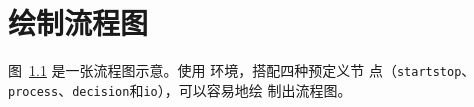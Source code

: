 
\chapter{绘制流程图}

图~\ref{fig:flow_chart} 是一张流程图示意。使用  环境，搭配四种预定义节
点（\verb+startstop+、\verb+process+、\verb+decision+和\verb+io+），可以容易地绘
制出流程图。

\begin{figure}[!htp]
  \centering
  \resizebox{6cm}{!}{}
  \label{fig:flow_chart}
\end{figure}
